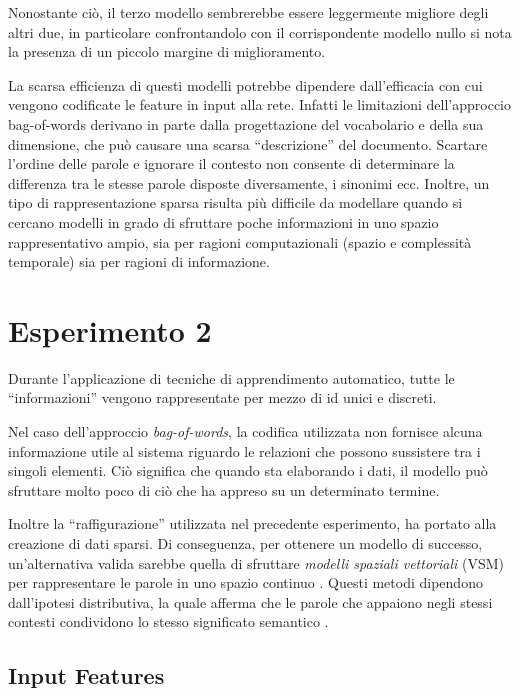 Nonostante ciò, il terzo modello sembrerebbe essere leggermente migliore degli altri due, in particolare confrontandolo con il corrispondente modello nullo si nota la presenza di un piccolo margine di miglioramento.

La scarsa efficienza di questi modelli potrebbe dipendere dall'efficacia con cui vengono codificate le feature in input alla rete. 
Infatti le limitazioni dell'approccio bag-of-words derivano in parte dalla progettazione del vocabolario e della sua dimensione, che può causare una scarsa ``descrizione'' del documento. 
Scartare l'ordine delle parole e ignorare il contesto non consente di determinare la differenza tra le stesse parole disposte diversamente, i sinonimi ecc.
Inoltre, un tipo di rappresentazione sparsa risulta più difficile da modellare quando si cercano modelli in grado di sfruttare poche informazioni in uno spazio rappresentativo ampio, sia per ragioni computazionali (spazio e complessità temporale) sia per ragioni di informazione.

\section{Esperimento 2}
\label{sec:es2}

Durante l'applicazione di tecniche di apprendimento automatico, tutte le ``informazioni'' vengono rappresentate per mezzo di id unici e discreti. 

Nel caso dell'approccio \emph{bag-of-words}, la codifica utilizzata non fornisce alcuna informazione utile al sistema riguardo le relazioni che possono sussistere tra i singoli elementi. Ciò significa che quando sta elaborando i dati, il modello può sfruttare molto poco di ciò che ha appreso su un determinato termine. 

Inoltre la ``raffigurazione'' utilizzata nel precedente esperimento, ha portato alla creazione di dati sparsi. Di conseguenza, per ottenere un modello di successo, un'alternativa valida sarebbe quella di sfruttare \emph{modelli spaziali vettoriali} (VSM) per rappresentare le parole in uno spazio continuo \cite{mikolov2013linguistic,erk2008structured}.
Questi metodi dipendono dall'ipotesi distributiva, la quale afferma che le parole che appaiono negli stessi contesti condividono lo stesso significato semantico \cite{baroni2014don}. 

\subsection{Input Features}
\label{subsec:features2}

